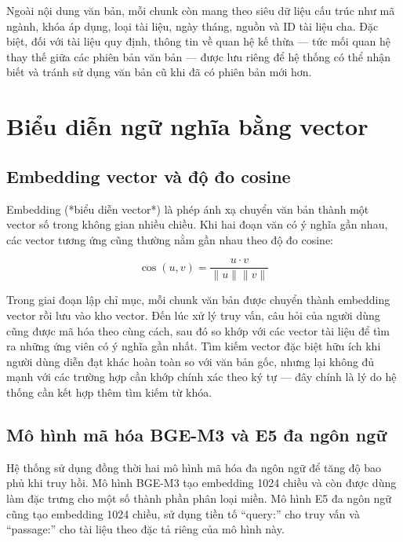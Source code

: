 \documentclass[../DoAn.tex]{subfiles}
\begin{document}
Ngoài nội dung văn bản, mỗi chunk còn mang theo siêu dữ liệu cấu trúc như mã
ngành, khóa áp dụng, loại tài liệu, ngày tháng, nguồn và ID tài liệu cha. Đặc
biệt, đối với tài liệu quy định, thông tin về quan hệ kế thừa --- tức mối quan
hệ thay thế giữa các phiên bản văn bản --- được lưu riêng để hệ thống có thể
nhận biết và tránh sử dụng văn bản cũ khi đã có phiên bản mới hơn.

\section{Biểu diễn ngữ nghĩa bằng vector}

\subsection{Embedding vector và độ đo cosine}

Embedding (*biểu diễn vector*) là phép ánh xạ chuyển văn bản thành một vector
số trong không gian nhiều chiều. Khi hai đoạn văn có ý nghĩa gần nhau, các
vector tương ứng cũng thường nằm gần nhau theo độ đo cosine:

\begin{equation}
\operatorname{cos}(u,v) =
\frac{u \cdot v}{\|u\| \|v\|}
\end{equation}

Trong giai đoạn lập chỉ mục, mỗi chunk văn bản được chuyển thành embedding
vector rồi lưu vào kho vector. Đến lúc xử lý truy vấn, câu hỏi của người dùng
cũng được mã hóa theo cùng cách, sau đó so khớp với các vector tài liệu để tìm
ra những ứng viên có ý nghĩa gần nhất. Tìm kiếm vector đặc biệt hữu ích khi
người dùng diễn đạt khác hoàn toàn so với văn bản gốc, nhưng lại không đủ mạnh
với các trường hợp cần khớp chính xác theo ký tự --- đây chính là lý do hệ
thống cần kết hợp thêm tìm kiếm từ khóa.

\subsection{Mô hình mã hóa BGE-M3 và E5 đa ngôn ngữ}

Hệ thống sử dụng đồng thời hai mô hình mã hóa đa ngôn ngữ để tăng độ bao phủ
khi truy hồi. Mô hình BGE-M3 \cite{bgem3} tạo embedding 1024 chiều và còn được dùng làm đặc
trưng cho một số thành phần phân loại miền. Mô hình E5 \cite{e5model} đa ngôn ngữ cũng tạo
embedding 1024 chiều, sử dụng tiền tố ``query:'' cho truy vấn và ``passage:''
cho tài liệu theo đặc tả riêng của mô hình này.
\end{document}
